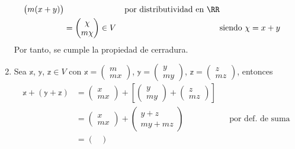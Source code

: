 \begin{examplebox}{}{}
\begin{enumerate}[label=\roman*), topsep=6pt, itemsep=0pt]
\begin{align*}
\begin{pmatrix}
                m(x + y)
            \end{pmatrix} && \text{por distributividad en $\RR$} \\
            & = \begin{pmatrix}
                \chi \\
                m\chi
            \end{pmatrix} \in V && \text{siendo $\chi = x + y$}
        \end{align*}
        Por tanto, se cumple la propiedad de cerradura.\newpage
        \item Sea $\mathbb{x}$, $\mathbb{y}$, $\mathbb{z} \in V$ con $\mathbb{x} = \begin{pmatrix}
            m \\
            mx
        \end{pmatrix}$, $\mathbb{y} = \begin{pmatrix}
            y \\
            my
        \end{pmatrix}$, $\mathbb{z} = \begin{pmatrix}
            z \\
            mz
        \end{pmatrix}$, entonces
        \begin{align*}
            \mathbb{x} + (\mathbb{y} + \mathbb{z}) & = \begin{pmatrix}
                x \\
                mx
            \end{pmatrix} + \left[ \begin{pmatrix}
                y \\
                my
            \end{pmatrix} + \begin{pmatrix}
                z \\
                mz
            \end{pmatrix} \right] \\
            & = \begin{pmatrix}
                x \\
                mx
            \end{pmatrix} + \begin{pmatrix}
                y + z \\
                my + mz
            \end{pmatrix} && \text{por def. de suma} \\
            & = \begin{pmatrix}

\end{pmatrix}
\end{align*}
\end{enumerate}
\end{examplebox}
